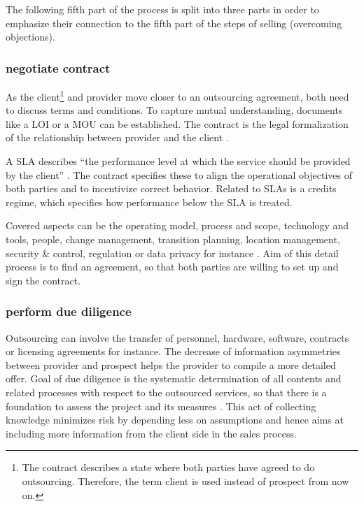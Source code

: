 	The following fifth part of the process is split into three parts in order to emphasize their connection to the fifth part of the steps of selling (overcoming objections). 
	
		
	\subsubsection{negotiate contract}
	
	As the client\footnote{The contract describes a state where both parties have agreed to do outsourcing. Therefore, the term client is used instead of prospect from now on.} and provider move closer to an outsourcing agreement, both need to discuss terms and conditions. To capture mutual understanding, documents like a \acrfull{LOI} or a \acrfull{MOU} can be established. The contract is the legal formalization of the relationship between provider and the client \citep{Franceschini_2003}. 
	
	A \acrfull{SLA} describes \enquote{the performance level at which the service should be provided by the client} \citep[]{deloittehandbook}. The contract specifies these to align the operational objectives of both parties and to incentivize correct behavior. Related to \acrshort{SLA}s is a credits regime, which specifies how performance below the \acrshort{SLA} is treated. 
	
	Covered aspects can be the operating model, process and scope, technology and tools, people, change management, transition planning, location management, security \& control, regulation or data privacy for instance \citep{deloittehandbook}. Aim of this detail process is to find an agreement, so that both parties are willing to set up and sign the contract.
	
	
	\subsubsection{perform due diligence}
	
	Outsourcing can involve the transfer of personnel, hardware, software, contracts or licensing agreements for instance. The decrease of information asymmetries between provider and prospect helps the provider to compile a more detailed offer. Goal of due diligence is the systematic determination of all contents and related processes with respect to the outsourced services, so that there is a foundation to assess the project and its measures \citep[]{bitkom2008}. This act of collecting knowledge minimizes risk by depending less on assumptions and hence aims at including more information from the client side in the sales process. 

